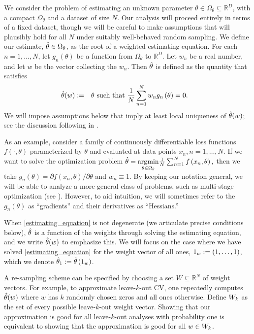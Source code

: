 We consider the problem of estimating an unknown parameter
$\theta\in\Omega_{\theta}\subseteq\mathbb{R}^{D}$, with a compact
$\Omega_{\theta}$ and a dataset of size $N$. Our analysis will proceed entirely
in terms of a fixed dataset, though we will be careful to make assumptions that
will plausibly hold for all $N$ under suitably well-behaved random sampling. We
define our estimate, $\hat{\theta}\in\Omega_{\theta}$, as the root of a weighted
estimating equation. For each $n=1, \ldots, N$, let $g_{n}\left(\theta\right)$ be a
function from $\Omega_{\theta}$ to $\mathbb{R}^{D}$. Let $w_{n}$ be a real
number, and let $w$ be the vector collecting the $w_n$.
Then $\hat{\theta}$ is defined as the quantity that satisfies
%
\begin{align}
\hat{\theta}(w):= &
    \quad\theta\textrm{ such that }
    \frac{1}{N}\sum_{n=1}^{N}w_{n}g_{n}\left(\theta\right) = 0.
    \label{eq:estimating_equation}
\end{align}
%
We will impose assumptions below that imply at least local uniqueness of
$\hat{\theta}(w)$; see the discussion following  in
.

As an example, consider a family of continuously differentiable loss functions
$f\left(\cdot, \theta\right)$ parameterized by $\theta$ and evaluated at data
points $x_{n},n=1, \ldots, N$. If we want to solve the optimization problem
%
$\hat{\theta}=\underset{\theta\in\Omega_{\theta}}
    {\mathrm{argmin}}\frac{1}{N}\sum_{n=1}^{N}f\left(x_{n},\theta\right),$
%
then we take $g_{n}\left(\theta\right)=\partial
f\left(x_{n},\theta\right)/\partial\theta$ and $w_{n}\equiv1$. By keeping our
notation general, we will be able to analyze a more general class of problems,
such as multi-stage optimization (see ). However, to aid
intuition, we will sometimes refer to the $g_{n}\left(\theta\right)$ as
``gradients'' and their derivatives as ``Hessians.''

When \eqref{estimating_equation} is not degenerate (we articulate precise
conditions below), $\hat{\theta}$ is a function of the weights through solving the
estimating equation, and we write $\hat{\theta}(w)$ to emphasize this.
We will focus on the case where we have solved \eqref{estimating_equation} for
the weight vector of all ones, $1_{w}:=\left(1, \ldots, 1\right)$, which we denote
$\hat{\theta}_{1} := \hat{\theta}\left(1_{w}\right)$.

A re-sampling scheme can be specified by choosing a set
$W\subseteq\mathbb{R}^{N}$ of weight vectors. For example, to approximate
leave-$k$-out CV, one repeatedly computes $\hat{\theta}(w)$ where $w$ has $k$ randomly
chosen zeros and all ones otherwise.  Define $W_k$ as the set of every possible
leave-$k$-out weight vector.  Showing that our approximation is good for all
leave-$k$-out analyses with probability one is equivalent to showing that the
approximation is good for all $w \in W_k$.

